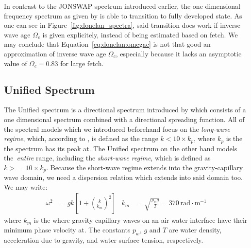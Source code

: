 %

In contrast to the JONSWAP spectrum introduced earlier, the one dimensional 
frequency spectrum as given by \citeauthor{article:Donelan1985} is able to
transition to fully developed state. As one can see in
Figure~\ref{fig:donelan_spectra}, said transition does work if inverse wave age
$\Omega_c$ is given explicitely, instead of being estimated based on fetch.
We may conclude that Equation~\ref{eq:donelan:omegac} is not that good an
approximation of inverse wave age $\Omega_c$, especially because it lacks an
asymptotic value of $\Omega_c=0.83$ for large fetch.
%
\subsection{Unified Spectrum}
\label{sec:unified_spectrum}
%
The Unified spectrum is a directional \wavenumber spectrum introduced by
\citet{article:Elfouhaily1997} which consists of a one 
dimensional \wavenumber spectrum combined with a directional spreading 
function. All of the spectral models which we introduced beforehand focus on 
the \emph{long-wave regime}, which, according to \citeauthor{article:Elfouhaily1997},
is defined as the \wavenumber range $k < 10\times k_p$, where $k_p$ is
the \wavenumber the spectrum has its peak at. The Unified spectrum on the
other hand models the~\emph{entire} \wavenumber range, including the
\emph{short-wave regime}, which is defined as $k >= 10\times k_p$.
Because the short-wave regime extends into the gravity-capillary wave domain,
we need a dispersion relation which extends into said domain too.
We may write:
\begin{align}
\omega^2 &= gk\left[1 + \left(\frac{k}{k_m}\right)^2\right] &
k_m &= \sqrt{\frac{p_w g}{T}} = 370~\text{rad}\cdot\text{m}^{-1}
\end{align}
where $k_m$ is the \wavenumber where gravity-capillary waves on an air-water
interface have their minimum phase velocity at. The constants $p_w$, $g$ and
$T$ are water density, acceleration due to gravity, and water surface tension,
respectively.

